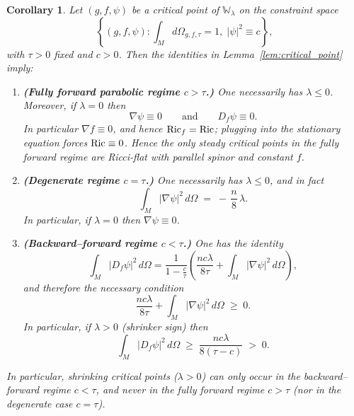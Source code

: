 \documentclass{amsart}
\newtheorem{corollary}[theorem]{Corollary}
\theoremstyle{definition}
\theoremstyle{remark}
\numberwithin{equation}{section}
\newcommand{\Ric}{\textup{Ric}}
\begin{document}
\begin{corollary}\label{cor:regimes}
Let $(g,f,\psi)$ be a critical point of $\mathbb{W}_\lambda$ on the constraint space
\[
\left\{(g,f,\psi):\int_M d\Omega_{g,f,\tau}=1,\;|\psi|^2\equiv c\right\},
\]
with $\tau>0$ fixed and $c>0$. Then the identities in Lemma~\ref{lem:critical_point} imply:

\begin{enumerate}
\item[(i)] \textbf{(Fully forward parabolic regime $c>\tau$.)}
One necessarily has $\lambda\le 0$. Moreover, if $\lambda=0$ then
\[
\nabla\psi\equiv 0
\qquad\text{and}\qquad
D_f\psi\equiv 0.
\]
In particular $\nabla f\equiv 0$, and hence $\Ric_f=\Ric$; plugging into the stationary equation
forces $\Ric\equiv 0$. Hence the only steady critical points in the fully forward regime are Ricci-flat with parallel spinor and constant $f$.

\item[(ii)] \textbf{(Degenerate regime $c=\tau$.)}
One necessarily has $\lambda\le 0$, and in fact
\[
\int_M |\nabla\psi|^2\,d\Omega \;=\; -\,\frac{n}{8}\,\lambda.
\]
In particular, if $\lambda=0$ then $\nabla\psi\equiv 0$.

\item[(iii)] \textbf{(Backward--forward regime $c<\tau$.)}
One has the identity
\[
\int_M |D_f\psi|^2\,d\Omega
=\frac{1}{1-\frac{c}{\tau}}
\left(\frac{nc\lambda}{8\tau}+\int_M |\nabla\psi|^2\,d\Omega\right),
\]
and therefore the necessary condition
\[
\frac{nc\lambda}{8\tau}+\int_M |\nabla\psi|^2\,d\Omega \;\ge\; 0.
\]
In particular, if $\lambda>0$ (shrinker sign) then
\[
\int_M |D_f\psi|^2\,d\Omega \;\ge\; \frac{nc\lambda}{8(\tau-c)} \;>\;0.\]
\end{enumerate}

In particular, \emph{shrinking} critical points ($\lambda>0$) can only occur in the backward--forward
regime $c<\tau$, and never in the fully forward regime $c>\tau$ (nor in the degenerate case $c=\tau$).
\end{corollary}
\end{document}
